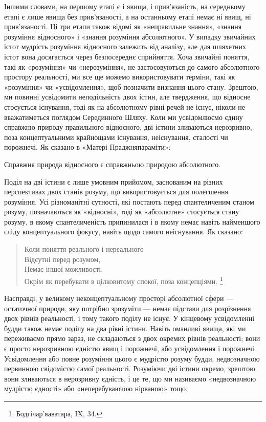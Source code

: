 \documentclass{article}
\begin{document}
Іншими словами, на першому етапі є і явища, і прив’язаність, на середньому етапі є лише явища без прив’язаності, а на останньому етапі немає ні явищ, ні прив’язаності. Ці три етапи також відомі як «неправильне знання», «знання розуміння відносного» і «знання розуміння абсолютного». У випадку звичайних істот мудрість розуміння відносного залежить від аналізу, але для шляхетних істот вона досягається через безпосереднє сприйняття. Хоча звичайні поняття, такі як «розуміння» чи «нерозуміння», не застосовуються до самого абсолютного простору реальності, ми все ще можемо використовувати терміни, такі як «розуміння» чи «усвідомлення», щоб позначити визнання цього стану. Зрештою, ми повинні усвідомити неподільність двох істин, але твердження, що відносне стосується існування, тоді як на абсолютному рівні речей не існує, ніколи не вважатиметься поглядом Серединного Шляху. Коли ми усвідомлюємо єдину справжню природу правильного відносного, дві істини зливаються нерозривно, поза концептуальними крайнощами існування, неіснування, сталості чи порожнечі. Як сказано в «Матері Праджняпараміти»:

Справжня природа відносного є справжньою природою абсолютного.

Поділ на дві істини є лише умовним прийомом, заснованим на різних перспективах двох станів розуму, що використовується для полегшення розуміння. Усі різноманітні сутності, які постають перед спантеличеним станом розуму, позначаються як «відносні», тоді як «абсолютне» стосується стану розуму, в якому спантеличеність припинилася і в якому немає навіть найменшого сліду концептуального фокусу, навіть щодо самого неіснування. Як сказано:

\begin{verse}
        Коли поняття реального і нереального \\
        Відсутні перед розумом, \\
        Немає іншої можливості, \\
        Окрім як перебувати в цілковитому спокої, поза концепціями. \footnote{Бодгічар’яаватара, IX, 34.} \\
\end{verse}

Насправді, у великому неконцептуальному просторі абсолютної сфери — остаточної природи, яку потрібно зрозуміти — немає підстави для розрізнення двох рівнів реальності, і тому такого поділу не існує. У кінцевому усвідомленні будди також немає поділу на два рівні істини. Навіть оманливі явища, які ми переживаємо прямо зараз, не складаються з двох окремих рівнів реальності; вони є просто нерозривною єдністю явищ і порожнечі, або усвідомлення і порожнечі.
Усвідомлення або повне розуміння цього є мудрістю розуму будди, недвозначною первинною свідомістю самої реальності. Розуміючи дві істини окремо, зрештою вони зливаються в нерозривну єдність, і це те, що ми називаємо «недвозначною мудрістю єдності» або «неперебуваючою нірваною» тощо.
\end{document}
